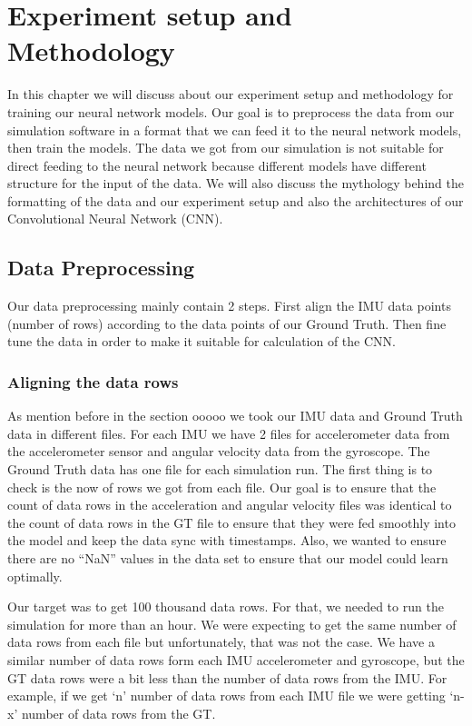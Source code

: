 
\chapter{Experiment setup and Methodology}\label{chapter:experiment_setup}
In this chapter we will discuss about our experiment setup and methodology for training our neural network models. Our goal is to preprocess the data from our simulation software in a format that we can feed it to the neural network models, then train the models. The data we got from our simulation is not suitable for direct feeding to the neural network because different models have different structure for the input of the data. We will also discuss the mythology behind the formatting of the data and our experiment setup and also the architectures of our Convolutional Neural Network (CNN).


\section{Data Preprocessing}

Our data preprocessing mainly contain 2 steps. First align the IMU data points (number of rows) according to the data points of our Ground Truth. Then fine tune the data in order to make it suitable for calculation of the CNN.

\subsection{Aligning the data rows}

As mention before in the section ooooo we took our IMU data and Ground Truth data in different files. For each IMU we have 2 files for accelerometer data from the accelerometer sensor and angular velocity data from the gyroscope. The Ground Truth data has one file for each simulation run.  The first thing is to check is the now of rows we got from each file. Our goal is to ensure that the count of data rows in the acceleration and angular velocity files was identical to the count of data rows in the GT file to ensure that they were fed smoothly into the model and keep the data sync with timestamps. Also, we wanted to ensure there are no “NaN” values in the data set to ensure that our model could learn optimally.

Our target was to get 100 thousand data rows. For that, we needed to run the simulation for more than an hour. We were expecting to get the same number of data rows from each file but unfortunately, that was not the case. We have a similar number of data rows form each IMU accelerometer and gyroscope, but the GT data rows were a bit less than the number of data rows from the IMU. For example, if we get ‘n’ number of data rows from each IMU file we were getting ‘n-x’ number of data rows from the GT.

